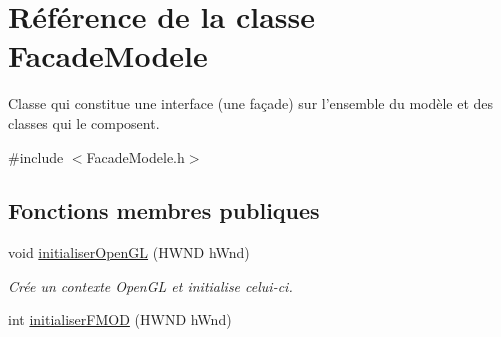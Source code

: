 \hypertarget{class_facade_modele}{\section{Référence de la classe Facade\-Modele}
\label{class_facade_modele}
}


Classe qui constitue une interface (une façade) sur l'ensemble du modèle et des classes qui le composent.  




{\ttfamily \#include $<$Facade\-Modele.\-h$>$}

\subsection*{Fonctions membres publiques}
\begin{DoxyCompactItemize}
\item 
void \hyperlink{group__inf2990_gabf12ccafbabf1049cb8327cf78699a1b}{initialiser\-Open\-G\-L} (H\-W\-N\-D h\-Wnd)
\begin{DoxyCompactList}\small\item\em Crée un contexte Open\-G\-L et initialise celui-\/ci. \end{DoxyCompactList}\item 
\hypertarget{class_facade_modele_a9361a57f2cd51f98bc9d0fffd3c1f966}{int \hyperlink{class_facade_modele_a9361a57f2cd51f98bc9d0fffd3c1f966}{initialiser\-F\-M\-O\-D} (H\-W\-N\-D h\-Wnd)}\label{class_facade_modele_a9361a57f2cd51f98bc9d0fffd3c1f966}


\end{DoxyCompactItemize}
